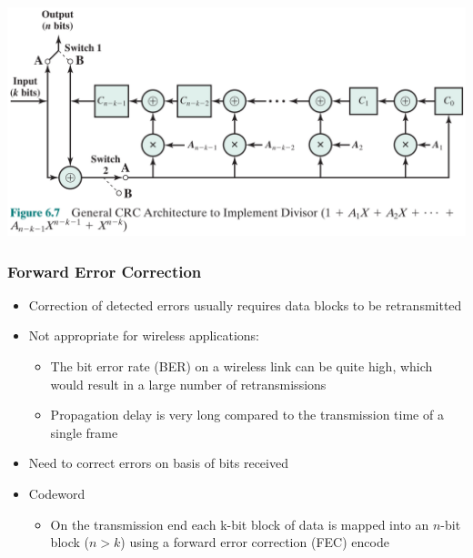 \documentclass[pdflatex,compress]{beamer}
\begin{document}
\begin{frame}
	\begin{center}
		\includegraphics[width=\linewidth]{img/img07}
	\end{center}
\end{frame}

\begin{frame}
	\frametitle{Forward Error Correction}
	\begin{itemize}
		\item Correction of detected errors usually requires data blocks to be retransmitted
		\item Not appropriate for wireless applications:
		\begin{itemize}
			\item The bit error rate (BER) on a wireless link can be quite high, which would result in a large number of retransmissions
			\item Propagation delay is very long compared to the transmission time of a single frame
		\end{itemize}
		\item Need to correct errors on basis of bits received
		\item Codeword
		\begin{itemize}
			\item On the transmission end each k-bit block of data is mapped into an $ n $-bit block ($ n > k $) using a forward error correction (FEC) encode
		\end{itemize}
	\end{itemize}	
\end{frame}
\end{document}
